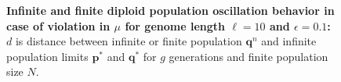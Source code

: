 \begin{figure}[H]
\begin{center}
\hspace{5pt}
\hspace{5pt}


\caption{\textbf{Infinite and finite diploid population oscillation behavior in case of violation in $\mu$ for genome length $\ell = 10$ and $\epsilon = 0.1$:} $d$ is
  distance between infinite or finite population ${\bm q}^n$ and infinite
  population limits ${{\bm p}^\ast}$ and ${{\bm q}^{\ast}}$ for $g$ generations and finite population size $N$.}
\label{oscillation_10d_vio_mu_0.1}
\end{center}
\end{figure}

